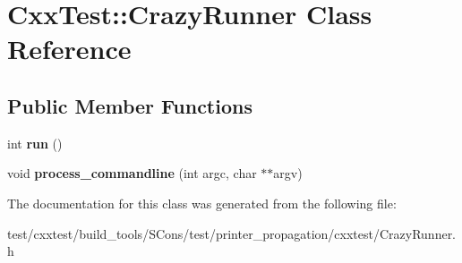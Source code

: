 \hypertarget{classCxxTest_1_1CrazyRunner}{\section{Cxx\-Test\-:\-:Crazy\-Runner Class Reference}
\label{classCxxTest_1_1CrazyRunner}
}
\subsection*{Public Member Functions}
\begin{DoxyCompactItemize}
\item 
\hypertarget{classCxxTest_1_1CrazyRunner_aeb86458eba84f95c8ea4346139cd2f41}{int {\bfseries run} ()}\label{classCxxTest_1_1CrazyRunner_aeb86458eba84f95c8ea4346139cd2f41}

\item 
\hypertarget{classCxxTest_1_1CrazyRunner_a310179439335274f503d8aa43b5318db}{void {\bfseries process\-\_\-commandline} (int argc, char $\ast$$\ast$argv)}\label{classCxxTest_1_1CrazyRunner_a310179439335274f503d8aa43b5318db}

\end{DoxyCompactItemize}


The documentation for this class was generated from the following file\-:\begin{DoxyCompactItemize}
\item 
test/cxxtest/build\-\_\-tools/\-S\-Cons/test/printer\-\_\-propagation/cxxtest/Crazy\-Runner.\-h\end{DoxyCompactItemize}
